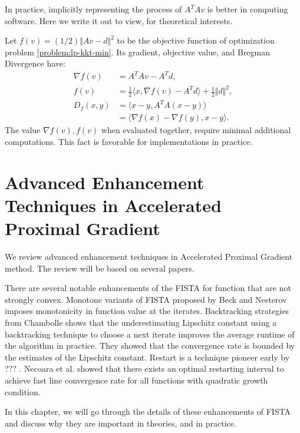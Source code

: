 \documentclass[12pt]{report}
\begin{document}
            In practice, implicitly representing the process of $A^TAv$ is better in computing software. 
            Here we write it out to view, for theoretical interests. 
            \par
            Let $f(v) = (1/2)\Vert Av - d\Vert^2$ to be the objective function of optimization problem \eqref{problem:lp-kkt-min}. 
            Its gradient, objective value, and Bregman Divergence have: 
            \begin{align*}
                \nabla f(v) &= A^TAv - A^Td, 
                \\
                f(v) &= 
                \frac{1}{2}\langle x, \nabla f(v) - A^Td\rangle + \frac{1}{2}\Vert d\Vert^2, 
                \\
                D_f(x, y) &= \langle x - y, A^TA (x - y)\rangle
                \\
                &= \langle \nabla f(x) - \nabla f(y), x - y\rangle. 
            \end{align*}
            The value $\nabla f(v), f(v)$ when evaluated together, require minimal additional computations. 
            This fact is favorable for implementations in practice. 

\chapter{Advanced Enhancement Techniques in Accelerated Proximal Gradient}
    We review advanced enhancement techniques in Accelerated Proximal Gradient method. 
    The review will be based on several papers. 
    \par
    There are several notable enhancements of the FISTA for function that are not strongly convex. 
    Monotone variants of FISTA proposed by Beck \todo{[?]} and Nesterov \todo{[?]} imposes monotonicity in function value at the iterates.  
    Backtracking strategies from Chambolle \todo{[?]} shows that the underestimating Lipschitz constant using a backtracking technique to choose a next iterate improves the average runtime of the algorithm in practice. 
    They showed that the convergence rate is bounded by the estimates of the Lipschitz constant. 
    Restart is a technique pioneer early by ??? \todo{[?]}. 
    Necoara et al. \cite{necoara_linear_2019} showed that there exists an optimal restarting interval to achieve fast line convergence rate for all functions with quadratic growth condition. 
    \par
    In this chapter, we will go through the details of these enhancements of FISTA and discuss why they are important in theories, and in practice. 
\end{document}
